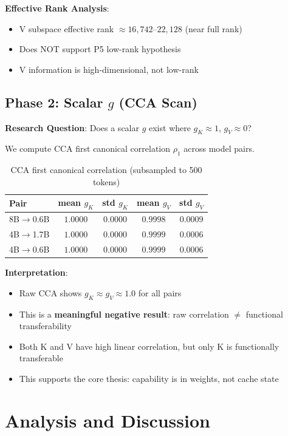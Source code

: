 \documentclass[11pt]{article}
\begin{document}
\textbf{Effective Rank Analysis}:
\begin{itemize}
    \item V subspace effective rank $\approx 16{,}742$--$22{,}128$ (near full rank)
    \item Does NOT support P5 low-rank hypothesis
    \item V information is high-dimensional, not low-rank
\end{itemize}

\subsection{Phase 2: Scalar $g$ (CCA Scan)}

\textbf{Research Question}: Does a scalar $g$ exist where $g_K \approx 1$, $g_V \approx 0$?

We compute CCA first canonical correlation $\rho_1$ across model pairs.

\begin{table}[h]
\centering
\caption{CCA first canonical correlation (subsampled to 500 tokens)}
\begin{tabular}{lcccc}
\toprule
Pair & mean $g_K$ & std $g_K$ & mean $g_V$ & std $g_V$ \\
\midrule
8B$\to$0.6B & $1.0000$ & $0.0000$ & $0.9998$ & $0.0009$ \\
4B$\to$1.7B & $1.0000$ & $0.0000$ & $0.9999$ & $0.0006$ \\
4B$\to$0.6B & $1.0000$ & $0.0000$ & $0.9999$ & $0.0006$ \\
\bottomrule
\end{tabular}
\end{table}

\textbf{Interpretation}:
\begin{itemize}
    \item Raw CCA shows $g_K \approx g_V \approx 1.0$ for all pairs
    \item This is a \textbf{meaningful negative result}: raw correlation $\neq$ functional transferability
    \item Both K and V have high linear correlation, but only K is functionally transferable
    \item This supports the core thesis: capability is in weights, not cache state
\end{itemize}

\section{Analysis and Discussion}
\end{document}
